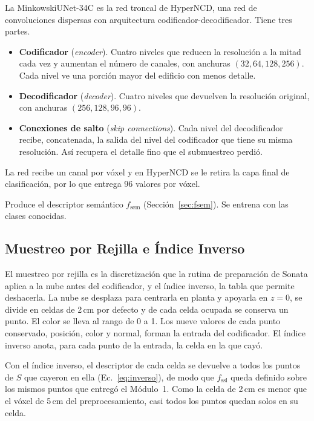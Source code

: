 La MinkowskiUNet-34C es la red troncal de HyperNCD, una red de convoluciones dispersas
con arquitectura codificador-decodificador.
Tiene tres partes.
\begin{itemize}\setlength{\itemsep}{1pt}
\item \textbf{Codificador} (\emph{encoder}). Cuatro niveles que reducen la
resolución a la mitad cada vez y aumentan el número de canales, con anchuras
$(32,64,128,256)$. Cada nivel ve una porción mayor del edificio con menos
detalle.
\item \textbf{Decodificador} (\emph{decoder}). Cuatro niveles que devuelven la
resolución original, con anchuras $(256,128,96,96)$.
\item \textbf{Conexiones de salto} (\emph{skip connections}). Cada nivel del
decodificador recibe, concatenada, la salida del nivel del codificador que tiene
su misma resolución. Así recupera el detalle fino que el submuestreo perdió.
\end{itemize}
La red recibe un canal por vóxel y en HyperNCD se le retira la capa final de
clasificación, por lo que entrega 96 valores por vóxel.

Produce el descriptor semántico $f_{\mathrm{sem}}$
(Sección~\ref{sec:fsem}). Se entrena con las clases conocidas.

\subsection{Muestreo por Rejilla e Índice Inverso}
\label{sec:gridsample}

El muestreo por rejilla es la discretización que la rutina de preparación de
Sonata aplica a la nube antes del codificador, y el índice inverso, la tabla que
permite deshacerla.
La nube se desplaza para centrarla en planta y apoyarla
en $z=0$, se divide en celdas de 2\,cm por defecto y de cada celda ocupada se
conserva un punto. El color se lleva al rango de 0 a 1. Los nueve valores de
cada punto conservado, posición, color y normal, forman la entrada del
codificador. El índice inverso anota, para cada punto de la entrada, la celda en
la que cayó.

Con el índice inverso, el descriptor de cada celda se
devuelve a todos los puntos de $S$ que cayeron en ella (Ec.~\eqref{eq:inverso}), de
modo que $f_{\mathrm{ssl}}$ queda definido sobre los mismos puntos que entregó el
Módulo~1. Como la celda de 2\,cm es menor que el vóxel de 5\,cm del
preprocesamiento, casi todos los puntos quedan solos en su celda.

